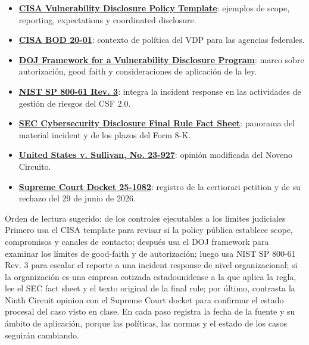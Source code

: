 \documentclass[a4paper]{article}
\begin{document}
{\small
\begin{itemize}[nosep,leftmargin=*]
  \item \href{https://www.cisa.gov/vulnerability-disclosure-policy-template}{\textbf{CISA Vulnerability Disclosure Policy Template}}: ejemplos de scope, reporting, expectations y coordinated disclosure.
  \item \href{https://www.cisa.gov/news-events/directives/bod-20-01-develop-and-publish-vulnerability-disclosure-policy}{\textbf{CISA BOD 20-01}}: contexto de política del VDP para las agencias federales.
  \item \href{https://www.justice.gov/criminal/criminal-ccips/page/file/983996/dl}{\textbf{DOJ Framework for a Vulnerability Disclosure Program}}: marco sobre autorización, good faith y consideraciones de aplicación de la ley.
  \item \href{https://csrc.nist.gov/pubs/sp/800/61/r3/final}{\textbf{NIST SP 800-61 Rev. 3}}: integra la incident response en las actividades de gestión de riesgos del CSF 2.0.
  \item \href{https://www.sec.gov/files/33-11216-fact-sheet.pdf}{\textbf{SEC Cybersecurity Disclosure Final Rule Fact Sheet}}: panorama del material incident y de los plazos del Form 8-K.
  \item \href{https://cdn.ca9.uscourts.gov/datastore/opinions/2025/11/12/23-927.pdf}{\textbf{United States v. Sullivan, No. 23-927}}: opinión modificada del Noveno Circuito.
  \item \href{https://www.supremecourt.gov/docket/docketfiles/html/public/25-1082.html}{\textbf{Supreme Court Docket 25-1082}}: registro de la certiorari petition y de su rechazo del 29 de junio de 2026.
\end{itemize}
}

\begin{knowledgebox}{Orden de lectura sugerido: de los controles ejecutables a los límites judiciales}
Primero usa el CISA template para revisar si la policy pública establece scope, compromisos y canales de contacto; después usa el DOJ framework para examinar los límites de good-faith y de autorización; luego usa NIST SP 800-61 Rev. 3 para escalar el reporte a una incident response de nivel organizacional; si la organización es una empresa cotizada estadounidense a la que aplica la regla, lee el SEC fact sheet y el texto original de la final rule; por último, contrasta la Ninth Circuit opinion con el Supreme Court docket para confirmar el estado procesal del caso visto en clase. En cada paso registra la fecha de la fuente y su ámbito de aplicación, porque las políticas, las normas y el estado de los casos seguirán cambiando.
\end{knowledgebox}
\end{document}
